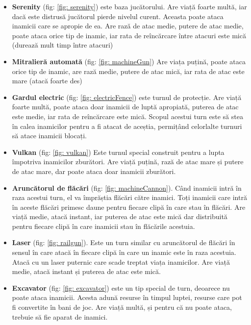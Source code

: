 \documentclass[12pt, a4paper]{article}
\begin{document}
	\begin{itemize}
		\item \textbf{Serenity} (fig: \ref{fig: serenity}) este baza jucătorului. Are viață foarte multă, iar dacă este distrusă jucătorul pierde nivelul curent. Aceasta poate ataca inamicii care se apropie de ea. Are rază de atac medie, putere de atac medie, poate ataca orice tip de inamic, iar rata de reîncărcare între atacuri este mică (durează mult timp între atacuri)
		\item \textbf{Mitralieră automată} (fig: \ref{fig: machineGun}) Are viața puțină, poate ataca orice tip de inamic, are rază medie, putere de atac mică, iar rata de atac este mare (atacă foarte des)
		\item \textbf{Gardul electric} (fig: \ref{fig: electricFence}) este turnul de protecție. Are viață foarte multă, poate ataca doar inamicii de luptă apropiată, puterea de atac este medie, iar rata de reîncărcare este mică. Scopul acestui turn este să stea în calea inamicilor pentru a fi atacat de aceștia, permițând celorlalte turnuri să atace inamicii blocați.
		\item \textbf{Vulkan} (fig: \ref{fig: vulkan}) Este turnul special construit pentru a lupta împotriva inamicilor zburători. Are viață puțină, rază de atac mare și putere de atac mare, dar poate ataca doar inamicii zburători.
		\item \textbf{Aruncătorul de flăcări} (fig: \ref{fig: machineCannon}). Când inamicii intră în raza acestui turn, el va împrăștia flăcări către inamici. Toți inamicii care intră în aceste flăcări primesc daune pentru fiecare clipă în care stau în flăcări. Are viață medie, atacă instant, iar puterea de atac este mică dar distribuită pentru fiecare clipă în care inamicii stau în flăcările acestuia.
		\item \textbf{Laser} (fig: \ref{fig: railgun}). Este un turn similar cu aruncătorul de flăcări în sensul în care atacă în fiecare clipă în care un inamic este în raza acestuia. Atacă cu un laser puternic care scade treptat viața inamicilor. Are viață medie, atacă instant și puterea de atac este mică.
		\item \textbf{Excavator} (fig: \ref{fig: excavator}) este un tip special de turn, deoarece nu poate ataca inamicii. Acesta adună resurse în timpul luptei, resurse care pot fi convertite în bani de joc. Are viață multă, și pentru că nu poate ataca, trebuie să fie aparat de inamici.
	\end{itemize}
	
\end{document}
